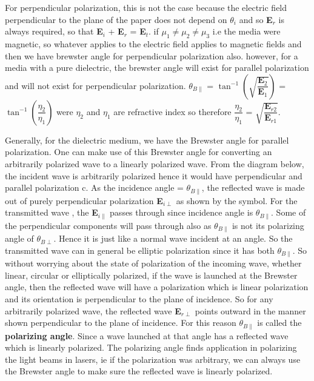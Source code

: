 For perpendicular polarization, this is not the case because the electric field perpendicular to the plane of the paper does not depend on $\theta_i$ and so \textbf{E}$_r$ is always required, so that \textbf{E}$_i$ + \textbf{E}$_r$ = \textbf{E}$_t$. if $\mu_1 \neq \mu_2 \neq \mu_3$ i.e the media were magnetic, so whatever applies to the electric field applies to magnetic fields and then we have brewster angle for perpendicular polarization also. however, for a media with a pure dielectric, the brewster angle will exist for parallel polarization and will not exist for perpendicular polarization. $\theta_{B\parallel}$ = $\tan^{-1}\left(\sqrt{\dfrac{\textbf{E}_2}{\textbf{E}_1}}\right)$ = $\tan^{-1}\left(\dfrac{\eta_2}{\eta_1}\right)$ were $\eta_2$ and $\eta_1$ are refractive index so therefore $\dfrac{\eta_2}{\eta_1}$ = $\sqrt{\dfrac{\textbf{E}_{r2}}{\textbf{E}_{r1}}}$.

Generally, for the dielectric medium, we have the Brewster angle for parallel polarization. One can make use of this Brewster angle for converting an arbitrarily polarized wave to a linearly polarized wave. From the diagram below, the incident wave is arbitrarily polarized hence it would have perpendicular and parallel polarization c. As the incidence angle = $\theta_{B\parallel}$, the reflected wave is made out of purely perpendicular polarization \textbf{E}$_{i\perp}$ as shown by the symbol. For the transmitted wave , the \textbf{E}$_{i\parallel}$ passes through since incidence angle is $\theta_{B\parallel}$. Some of the perpendicular components will pass through also as $\theta_{B\parallel}$ is not its polarizing angle of $\theta_{B\perp}$. Hence it is just like a normal wave incident at an angle. So the transmitted wave can in general be elliptic polarization since it has both $\theta_{B\parallel}$. So without worrying about the state of polarization of the incoming wave, whether linear, circular or elliptically polarized, if the wave is launched at the Brewster angle, then the reflected wave will have a polarization which is linear polarization and its orientation is perpendicular to the plane of incidence. So for any arbitrarily polarized wave, the reflected wave \textbf{E}$_{r\perp}$ points outward in the manner shown perpendicular to the plane of incidence. For this reason $\theta_{B\parallel}$ is called the \textbf{polarizing angle}. Since a wave launched at that angle has a reflected wave which is linearly polarized. The polarizing angle finds application in polarizing the light beams in lasers, ie if the polarization was arbitrary, we can always use the Brewster angle to make sure the reflected wave is linearly polarized. 


